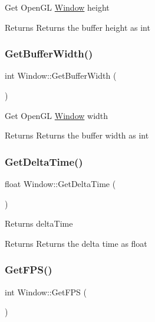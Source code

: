Get Open\+GL \mbox{\hyperlink{class_window}{Window}} height \begin{DoxyReturn}{Returns}
Returns the buffer height as int 
\end{DoxyReturn}
\mbox{\label{class_window_a130624b840f7a1ee320a4170e4de0ddf}} 
\subsubsection{\texorpdfstring{GetBufferWidth()}{GetBufferWidth()}}
{\footnotesize\ttfamily int Window\+::\+Get\+Buffer\+Width (\begin{DoxyParamCaption}{ }\end{DoxyParamCaption})\hspace{0.3cm}{\ttfamily [inline]}}

Get Open\+GL \mbox{\hyperlink{class_window}{Window}} width \begin{DoxyReturn}{Returns}
Returns the buffer width as int 
\end{DoxyReturn}
\mbox{\label{class_window_ae7ce0586147cc93ba68d6ee929413f22}} 
\subsubsection{\texorpdfstring{GetDeltaTime()}{GetDeltaTime()}}
{\footnotesize\ttfamily float Window\+::\+Get\+Delta\+Time (\begin{DoxyParamCaption}{ }\end{DoxyParamCaption})}

Returns delta\+Time \begin{DoxyReturn}{Returns}
Returns the delta time as float 
\end{DoxyReturn}
\mbox{\label{class_window_acea62a6c3bb82c234e7e33a8e53f17d8}} 
\subsubsection{\texorpdfstring{GetFPS()}{GetFPS()}}
{\footnotesize\ttfamily int Window\+::\+Get\+F\+PS (\begin{DoxyParamCaption}{ }\end{DoxyParamCaption})}

